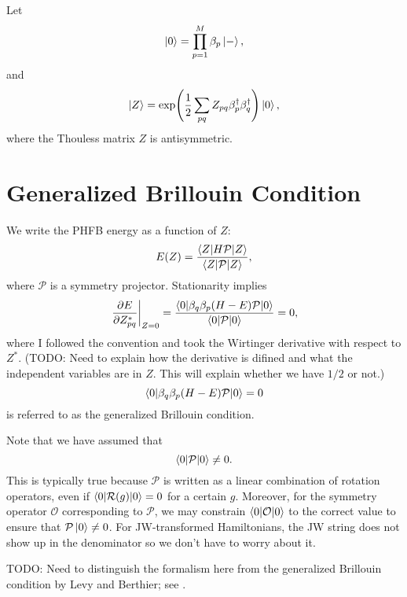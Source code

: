 \documentclass[11pt,letterpaper]{article}
\begin{document}
Let
\begin{equation}
  \label{eq:hfb}
  \ket{0} = \prod_{p=1}^M \beta_p \ket{-},
\end{equation}
and
\begin{equation}
  \ket{Z} = \exp(\frac{1}{2} \sum_{pq} Z_{pq} \beta^\dag_p \beta^\dag_q) \ket{0},
\end{equation}
where the Thouless matrix $Z$ is antisymmetric.


\section{Generalized Brillouin Condition}

We write the PHFB energy as a function of $Z$:
\begin{equation}
  E(Z) =
  \frac{\braket{Z|H\mathcal{P}|Z}}{\braket{Z|\mathcal{P}|Z}},
\end{equation}
where $\mathcal{P}$ is a symmetry projector.
Stationarity implies
\begin{equation}
  \label{eq:stationarity}
  \left.\frac{\partial E}{\partial Z^*_{pq}}\right|_{Z=0}
  = \frac{\braket{0|\beta_q \beta_p (H - E)\mathcal{P}|0}}{\braket{0|\mathcal{P}|0}}
  = 0,
\end{equation}
where I followed the convention and took the Wirtinger derivative with respect to $Z^*$.
(TODO: Need to explain how the derivative is difined and what the independent variables
are in $Z$. This will explain whether we have $1/2$ or not.)
\begin{equation}
  \label{eq:brillouin}
  \braket{0|\beta_q \beta_p (H - E)\mathcal{P}|0} = 0
\end{equation}
is referred to as the generalized Brillouin condition.

Note that we have assumed that
\begin{equation}
  \braket{0|\mathcal{P}|0} \neq 0.
\end{equation}
This is typically true because $\mathcal{P}$ is written as a linear combination of rotation operators,
even if $\braket{0|\mathcal{R}(g)|0} = 0$ for a certain $g$.
Moreover, for the symmetry operator $\mathcal{O}$ corresponding to $\mathcal{P}$,
we may constrain $\braket{0|\mathcal{O}|0}$ to the correct value to ensure that
$\mathcal{P} \ket{0} \neq 0$.
For JW-transformed Hamiltonians, the JW string does not show up in the denominator
so we don't have to worry about it.

TODO: Need to distinguish the formalism here from the generalized Brillouin condition
by Levy and Berthier; see \cite{Kutzelnigg1979}.
\end{document}
